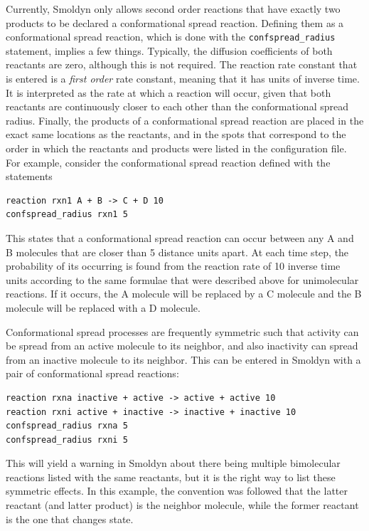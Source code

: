 \documentclass {book}
\newcommand {\ttt} {\texttt}
\begin{document}
Currently, Smoldyn only allows second order reactions that have exactly two products to be declared a conformational spread reaction. Defining them as a conformational spread reaction, which is done with the \ttt{confspread\_radius} statement, implies a few things. Typically, the diffusion coefficients of both reactants are zero, although this is not required. The reaction rate constant that is entered is a \textit{first order} rate constant, meaning that it has units of inverse time. It is interpreted as the rate at which a reaction will occur, given that both reactants are continuously closer to each other than the conformational spread radius. Finally, the products of a conformational spread reaction are placed in the exact same locations as the reactants, and in the spots that correspond to the order in which the reactants and products were listed in the configuration file. For example, consider the conformational spread reaction defined with the statements
\begin{lstlisting}[style=SSAC]
reaction rxn1 A + B -> C + D 10
confspread_radius rxn1 5
\end{lstlisting}
This states that a conformational spread reaction can occur between any A and B molecules that are closer than 5 distance units apart. At each time step, the probability of its occurring is found from the reaction rate of 10 inverse time units according to the same formulae that were described above for unimolecular reactions. If it occurs, the A molecule will be replaced by a C molecule and the B molecule will be replaced with a D molecule.

Conformational spread processes are frequently symmetric such that activity can be spread from an active molecule to its neighbor, and also inactivity can spread from an inactive molecule to its neighbor. This can be entered in Smoldyn with a pair of conformational spread reactions:
\begin{lstlisting}[style=SSAC]
reaction rxna inactive + active -> active + active 10
reaction rxni active + inactive -> inactive + inactive 10
confspread_radius rxna 5
confspread_radius rxni 5
\end{lstlisting}
This will yield a warning in Smoldyn about there being multiple bimolecular reactions listed with the same reactants, but it is the right way to list these symmetric effects. In this example, the convention was followed that the latter reactant (and latter product) is the neighbor molecule, while the former reactant is the one that changes state.
\end{document}
